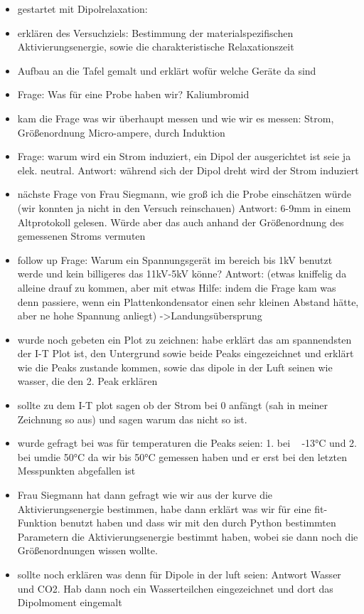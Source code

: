 \documentclass[
  bibliography=totoc,     %
  captions=tableheading,  %
  titlepage=firstiscover, %
]{scrartcl}
\begin{document}
\begin{itemize}
    \item gestartet mit Dipolrelaxation:
    \item erklären des Versuchziels: Bestimmung der materialspezifischen Aktivierungsenergie, sowie die charakteristische Relaxationszeit 
    \item Aufbau an die Tafel gemalt und erklärt wofür welche Geräte da sind
    \item Frage: Was für eine Probe haben wir? Kaliumbromid
    \item kam die Frage was wir überhaupt messen und wie wir es messen: Strom, Größenordnung Micro-ampere, durch Induktion 
    \item Frage: warum wird ein Strom induziert, ein Dipol der ausgerichtet ist seie ja elek. neutral. Antwort: während sich der Dipol dreht wird der Strom induziert
    \item nächste Frage von Frau Siegmann, wie groß ich die Probe einschätzen würde (wir konnten ja nicht in den Versuch reinschauen)
        Antwort: 6-9mm in einem Altprotokoll gelesen. Würde aber das auch anhand der Größenordnung des gemessenen Stroms
        vermuten 
    \item follow up Frage: Warum ein Spannungsgerät im bereich bis 1kV benutzt werde und kein billigeres das 11kV-5kV könne?
        Antwort: (etwas kniffelig da alleine drauf zu kommen, aber mit etwas Hilfe: indem die Frage kam was denn passiere, wenn
                    ein Plattenkondensator einen sehr kleinen Abstand hätte, aber ne hohe Spannung anliegt) ->Landungsübersprung 
    \item wurde noch gebeten ein Plot zu zeichnen: habe erklärt das am spannendsten der I-T Plot ist, den Untergrund sowie beide Peaks 
        eingezeichnet und erklärt wie die Peaks zustande kommen, sowie das dipole in der Luft seinen wie wasser, die den 2. Peak erklären
      
    \item sollte zu dem I-T plot sagen ob der Strom bei 0 anfängt (sah in meiner Zeichnung so aus) und sagen warum das nicht so ist. 
    \item wurde gefragt bei was für temperaturen die Peaks seien: 1. bei ~ -13°C und 2. bei umdie 50°C da wir bis 50°C gemessen haben und er erst bei den letzten
    Messpunkten abgefallen ist 
    \item Frau Siegmann hat dann gefragt wie wir aus der kurve die Aktivierungsenergie bestimmen, habe dann erklärt was wir für eine fit-Funktion benutzt haben und dass wir mit den durch Python bestimmten Parametern die Aktivierungsenergie bestimmt haben, wobei sie dann noch die Größenordnungen wissen wollte.
    \item sollte noch erklären was denn für Dipole in der luft seien: Antwort Wasser und CO2. Hab dann noch ein Wasserteilchen eingezeichnet und dort das 
    Dipolmoment eingemalt \\ \newline


\end{itemize}
\end{document}

